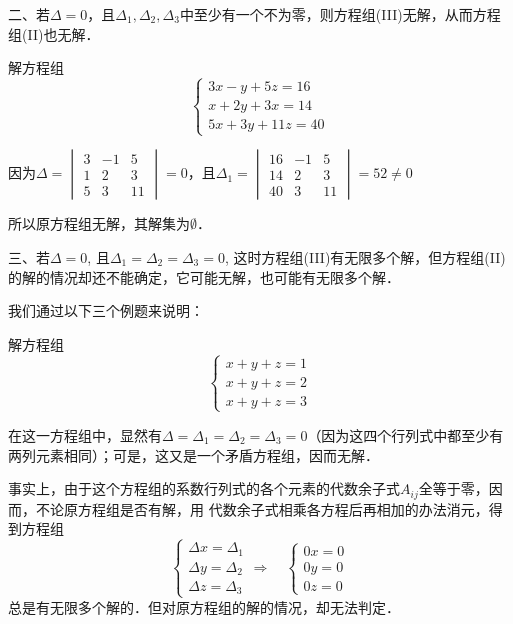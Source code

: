 二、若$\Delta=0$，且$\Delta_1,\Delta_2,\Delta_3$中至少有一个不为零，则方程组(III)无解，从而方程组(II)也无解．

\begin{example}
    解方程组
    \[\begin{cases}
        3x-y+5z=16\\
        x+2y+3x=14\\
        5x+3y+11z=40
    \end{cases}\]
\end{example}

\begin{solution}
因为$\Delta=\begin{vmatrix}
    3&-1&5\\1&2&3\\5&3&11
\end{vmatrix}=0$，且$\Delta_1=\begin{vmatrix}
    16&-1&5\\14&2&3\\40&3&11
\end{vmatrix}=52\ne 0$
    
所以原方程组无解，其解集为$\emptyset$．
\end{solution}

三、若$\Delta=0$, 且$\Delta_1=\Delta_2=\Delta_3=0$, 这时方程组(III)有无限多个解，但方程组(II)的解的情况却还不能确定，它可能无解，也可能有无限多个解．

我们通过以下三个例题来说明：
\begin{example}
    解方程组
\[\begin{cases}
    x+y+z=1\\x+y+z=2\\x+y+z=3
\end{cases}\]
\end{example}

\begin{solution}
在这一方程组中，显然有$\Delta=\Delta_1=\Delta_2=\Delta_3=0$（因为这四个行列式中都至少有两列元素相同）；可是，这又是一个矛盾方程组，因而无解．

事实上，由于这个方程组的系数行列式的各个元素的代数余子式$A_{ij}$全等于零，因而，不论原方程组是否有解，用
代数余子式相乘各方程后再相加的办法消元，得到方程组
\[\begin{cases}
    \Delta x=\Delta_1\\
    \Delta y=\Delta_2\\
    \Delta z=\Delta_3
\end{cases}\Rightarrow\quad \begin{cases}
    0x=0\\0y=0\\0z=0
\end{cases}\]
总是有无限多个解的．但对原方程组的解的情况，却无法判定．
\end{solution}

